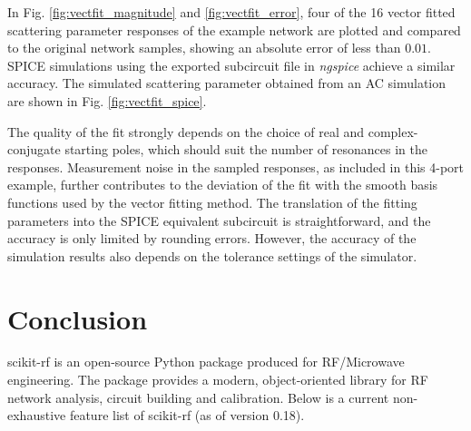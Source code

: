 \documentclass[10pt, letterpaper]{scrartcl}
\newcommand{\skrf}{{s}cikit-rf\xspace}
\begin{document}
In Fig. \ref{fig:vectfit_magnitude} and \ref{fig:vectfit_error}, four of the 16 vector fitted scattering parameter responses of the example network are plotted and compared to the original network samples, showing an absolute error of less than $0.01$. SPICE simulations using the exported subcircuit file in \textit{ngspice} \cite{ngspice_website} achieve a similar accuracy. The simulated scattering parameter obtained from an AC simulation are shown in Fig. \ref{fig:vectfit_spice}.

The quality of the fit strongly depends on the choice of real and complex-conjugate starting poles, which should suit the number of resonances in the responses. Measurement noise in the sampled responses, as included in this 4-port example, further contributes to the deviation of the fit with the smooth basis functions used by the vector fitting method. The translation of the fitting parameters into the SPICE equivalent subcircuit is straightforward, and the accuracy is only limited by rounding errors. However, the accuracy of the simulation results also depends on the tolerance settings of the simulator.

\section{Conclusion}
\skrf{} is an open-source Python package produced for RF/Microwave engineering. The package provides a modern, object-oriented library for RF network analysis, circuit building and calibration. Below is a current non-exhaustive feature list of \skrf{} (as of version 0.18).
\end{document}
